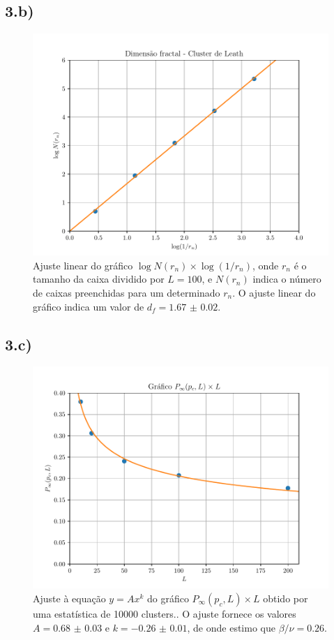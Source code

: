 \documentclass[a4paper, brazil]{article}
\begin{document}
\newpage
\subsection{3.b)}

\begin{figure}[ht]
    \centering
    \includegraphics[width=\textwidth]{fig_3b.pdf}
    \caption{Ajuste linear do gráfico \( \log N(r_n) \times \log(1 / r_n) \), onde \( r_n \) é o tamanho da caixa dividido por \( L = 100 \), e \( N(r_n) \) indica o número de caixas preenchidas para um determinado \( r_n \).
    O ajuste linear do gráfico indica um valor de \( d_f = \num{1.67(2)} \).}\label{fig3b}
    \end{figure}

\newpage
\subsection{3.c)}

\begin{figure}[ht]
    \centering
    \includegraphics[width=\textwidth]{fig_3c.pdf}
    \caption{Ajuste à equação \( y = A x^k \) do gráfico \( P_\infty (p_c, L) \times L \) obtido por uma estatística de 10000 clusters..
    O ajuste fornece os valores \( A = \num{0.68(3)} \) e \( k = \num{-0.26(1)} \), de onde estimo que \( \beta / \nu = \num{0.26} \).}\label{fig3c}
    \end{figure}
\end{document}
